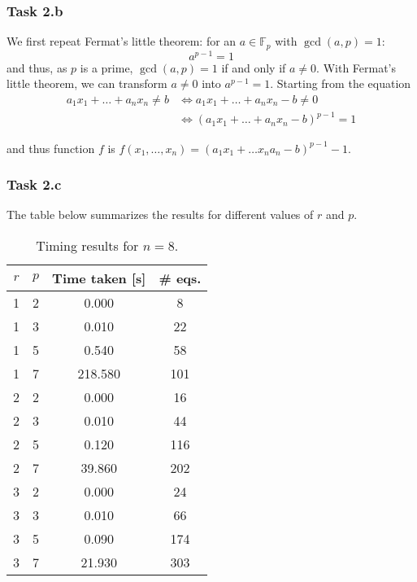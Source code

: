 \documentclass{article}
\begin{document}
\subsubsection*{Task 2.b}

We first repeat Fermat's little theorem: for an $a \in \mathbb{F}_p$ with
$\gcd(a, p) = 1$:
\begin{equation}
  a^{p-1} = 1
\end{equation} 
and thus, as $p$ is a prime, $\gcd(a, p) = 1$ if and only if $a \neq 0$. With
Fermat's little theorem, we can transform $a \neq 0$ into $a^{p - 1} = 1$.
Starting from the equation 
\begin{equation}
  \begin{split}
    a_1 x_1 + \dots + a_n x_n \neq b &\Leftrightarrow a_1 x_1 + \dots + a_n x_n - b
    \neq 0 \\
                                     &\Leftrightarrow  (a_1 x_1 + \dots + a_n
                                     x_n - b)^{p-1} = 1
  \end{split}
\end{equation} 

and thus function $f$ is $f(x_1, \dots, x_n) = (a_1x_1 + \dots x_n a_n -b)^{p-1}
- 1$.

\clearpage

\subsubsection*{Task 2.c}

The table below summarizes the results for different values of $r$ and $p$.

\begin{table}[htpb]
  \centering
  \caption{Timing results for $n = 8$.}
  \label{tab:label}
  \begin{tabular}{cccc}
  
    \toprule
    $r$ & $p$ & Time taken [s]  & \# eqs.\\
    \midrule
    1 & 2 & 0.000 & 8\\
    \midrule
    1 & 3 & 0.010 & 22\\
    \midrule
    1 & 5 & 0.540 & 58\\
    \midrule
    1 & 7 & 218.580 & 101\\
    \midrule
    2 & 2 & 0.000 & 16 \\
    \midrule
    2 & 3 & 0.010 & 44 \\
    \midrule
    2 & 5 & 0.120 & 116\\
    \midrule
    2 & 7 & 39.860 & 202\\
    \midrule
    3 & 2 & 0.000 & 24\\
    \midrule
    3 & 3 & 0.010 & 66 \\
    \midrule
    3 & 5 & 0.090 & 174 \\
    \midrule
    3 & 7 & 21.930 & 303\\
    \bottomrule
  \end{tabular}
\end{table}
\end{document}
